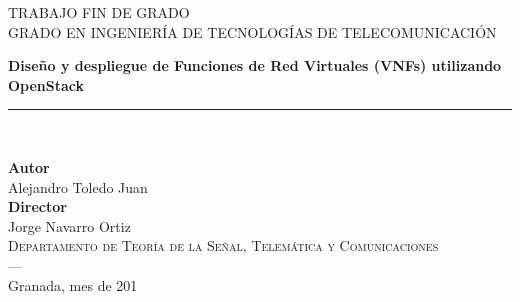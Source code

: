 \begin{titlepage}
 
 
\setlength{\centeroffset}{-0.5\oddsidemargin}
\addtolength{\centeroffset}{0.5\evensidemargin}
\thispagestyle{empty}

\noindent\hspace*{\centeroffset}\begin{minipage}{\textwidth}

\centering

\textsc{ \Large TRABAJO FIN DE GRADO\\[0.2cm]}
\textsc{ GRADO EN INGENIERÍA DE TECNOLOGÍAS DE TELECOMUNICACIÓN}\\[1cm]
% 

 \vspace{0.3cm}

 \vspace{0.5cm}


{\Huge\bfseries Diseño y despliegue de Funciones de Red Virtuales (VNFs) utilizando OpenStack\\
}
\noindent\rule[-1ex]{\textwidth}{3pt}\\[3.5ex]

\vspace{0.1cm}
\centering

\textbf{Autor}\\ {Alejandro Toledo Juan}\\[2.5ex]
\textbf{Director}\\
{Jorge Navarro Ortiz}\\[1.5cm]
\textsc{Departamento de Teoría de la Señal, Telemática y Comunicaciones}\\
\textsc{---}\\
Granada, mes de 201
\end{minipage}

 
\end{titlepage}


